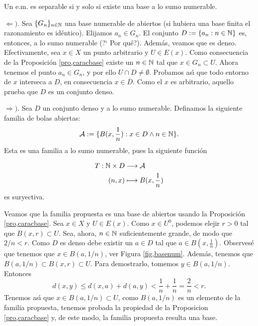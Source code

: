 \begin{teorema}\label{teo,basenum} Un e.m. es separable si y solo si existe una base
a lo sumo numerable.
\end{teorema}
\begin{demo}$\Leftarrow )$. Sea $\{G_n\}_{n\in\nn}$ una base numerable de
abiertos (si hubiera una base finita el razonamiento es
id\'entico). Elijamos $a_n\in G_n$. El conjunto
$D:=\{a_n:n\in\nn\}$ es, entonces, a lo sumo numerable (?` Por
qu\'e?). Adem\'as, veamos que es denso. Efectivamente, sea $x\in
X$ un punto arbitrario y $U\in E(x)$. Como consecuencia de la
Proposici\'on \vref{pro,caracbase} existe un $n\in\nn$ tal que
$x\in G_n\subset U$. Ahora tenemos el punto $a_n\in G_n$, y por
ello $U\cap D\neq\emptyset$. Probamos as\'{\i} que todo entorno de
$x$ interseca a $D$, en consecuencia $x\in \overline{D}$. Como el
$x$ es arbitrario, aquello prueba que $D$ es un conjunto denso.

$\Rightarrow )$. Sea $D$ un conjunto denso y a lo sumo numerable.
Definamos la siguiente familia de bolas abiertas:
\[
   \mathcal{A}:= \{B(x,\frac1n):x\in D \wedge n\in\nn\}.
\]
Esta es una familia a lo sumo numerable, pues la siguiente
funci\'on

\begin{eqnarray}
    T:\nn\times D&\longrightarrow\mathcal{A}\nonumber \\
    (n,x)&\longmapsto B(x,\frac1n)\nonumber \\
\end{eqnarray}
es suryectiva.

Veamos que la familia propuesta es una base de abiertos usando la
Proposici\'on \vref{pro,caracbase}. Sea $x\in X$ y $U\in E(x)$.
Como $x\in U^0$, podemos elejir $r>0$ tal que $B(x,r)\subset U$.
Sea, ahora, $n\in\nn$ suficientemente grande, de modo que $2/n<r$.
Como $D$ es denso debe existir un $a\in D$ tal que $a\in
B(x,\frac1n)$. Observes\'e que tenemos que $x\in B(a,1/n)$, ver
Figura \ref{fig,basenum}. Adem\'as, tenemos que $B(a,1/n)\subset
B(x,r)\subset U$. Para demostrarlo, tomemos $y\in B(a,1/n)$.
Entonces
\[
    d(x,y)\leq d(x,a)+d(a,y)<\frac1n+\frac1n=\frac2n<r.
\]
Tenemos as\'{\i} que $x\in B(a,1/n)\subset U$, como $B(a,1/n)$ es
un elemento de la familia propuesta, tenemos probada la propiedad
de la Proposicion \vref{pro,caracbase} y, de este modo, la familia
propuesta resulta una base.
\end{demo}
